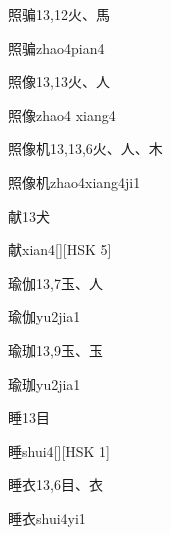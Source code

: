 \begin{entry}{照骗}{13,12}{⽕、⾺}
  \begin{phonetics}{照骗}{zhao4pian4}
  \end{phonetics}
\end{entry}

\begin{entry}{照像}{13,13}{⽕、⼈}
  \begin{phonetics}{照像}{zhao4 xiang4}
  \end{phonetics}
\end{entry}

\begin{entry}{照像机}{13,13,6}{⽕、⼈、⽊}
  \begin{phonetics}{照像机}{zhao4xiang4ji1}
  \end{phonetics}
\end{entry}

\begin{entry}{献}{13}{⽝}
  \begin{phonetics}{献}{xian4}[][HSK 5]
  \end{phonetics}
\end{entry}

\begin{entry}{瑜伽}{13,7}{⽟、⼈}
  \begin{phonetics}{瑜伽}{yu2jia1}
  \end{phonetics}
\end{entry}

\begin{entry}{瑜珈}{13,9}{⽟、⽟}
  \begin{phonetics}{瑜珈}{yu2jia1}
  \end{phonetics}
\end{entry}

\begin{entry}{睡}{13}{⽬}
  \begin{phonetics}{睡}{shui4}[][HSK 1]
  \end{phonetics}
\end{entry}

\begin{entry}{睡衣}{13,6}{⽬、⾐}
  \begin{phonetics}{睡衣}{shui4yi1}
  \end{phonetics}
\end{entry}

